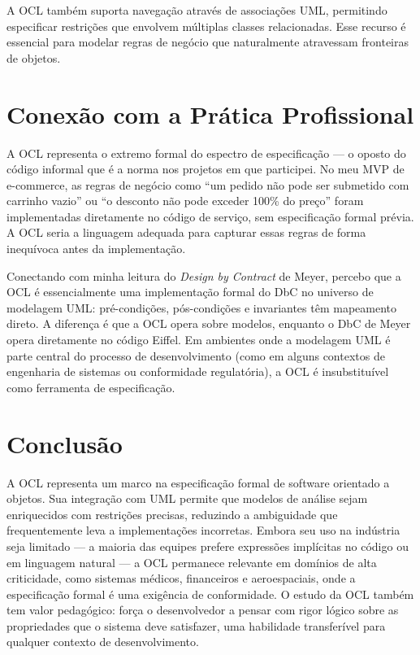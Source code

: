 \documentclass[12pt,a4paper]{article}
\begin{document}
A OCL tamb\'em suporta navega\c{c}\~ao atrav\'es de associa\c{c}\~oes UML,
permitindo especificar restri\c{c}\~oes que envolvem m\'ultiplas classes relacionadas.
Esse recurso \'e essencial para modelar regras de neg\'ocio que naturalmente
atravessam fronteiras de objetos.

\section{Conex\~ao com a Pr\'atica Profissional}

A OCL representa o extremo formal do espectro de especifica\c{c}\~ao --- o oposto
do c\'odigo informal que \'e a norma nos projetos em que participei. No meu MVP
de e-commerce, as regras de neg\'ocio como ``um pedido n\~ao pode ser submetido
com carrinho vazio'' ou ``o desconto n\~ao pode exceder 100\% do pre\c{c}o'' foram
implementadas diretamente no c\'odigo de servi\c{c}o, sem especifica\c{c}\~ao
formal pr\'evia. A OCL seria a linguagem adequada para capturar essas regras de
forma inequ\'ivoca antes da implementa\c{c}\~ao.

Conectando com minha leitura do \textit{Design by Contract} de Meyer, percebo
que a OCL \'e essencialmente uma implementa\c{c}\~ao formal do DbC no universo
de modelagem UML: pr\'e-condi\c{c}\~oes, p\'os-condi\c{c}\~oes e invariantes
t\^em mapeamento direto. A diferen\c{c}a \'e que a OCL opera sobre modelos,
enquanto o DbC de Meyer opera diretamente no c\'odigo Eiffel. Em ambientes onde
a modelagem UML \'e parte central do processo de desenvolvimento (como em alguns
contextos de engenharia de sistemas ou conformidade regulat\'oria), a OCL \'e
insubstitu\'ivel como ferramenta de especifica\c{c}\~ao.

\section{Conclus\~ao}

A OCL representa um marco na especifica\c{c}\~ao formal de software orientado a
objetos. Sua integra\c{c}\~ao com UML permite que modelos de an\'alise sejam
enriquecidos com restri\c{c}\~oes precisas, reduzindo a ambiguidade que frequentemente
leva a implementa\c{c}\~oes incorretas. Embora seu uso na ind\'ustria seja limitado
--- a maioria das equipes prefere express\~oes impl\'icitas no c\'odigo ou em
linguagem natural --- a OCL permanece relevante em dom\'inios de alta criticidade,
como sistemas m\'edicos, financeiros e aeroespaciais, onde a especifica\c{c}\~ao
formal \'e uma exig\^encia de conformidade. O estudo da OCL tamb\'em tem valor
pedag\'ogico: for\c{c}a o desenvolvedor a pensar com rigor l\'ogico sobre as
propriedades que o sistema deve satisfazer, uma habilidade transfer\'ivel para
qualquer contexto de desenvolvimento.
\end{document}
